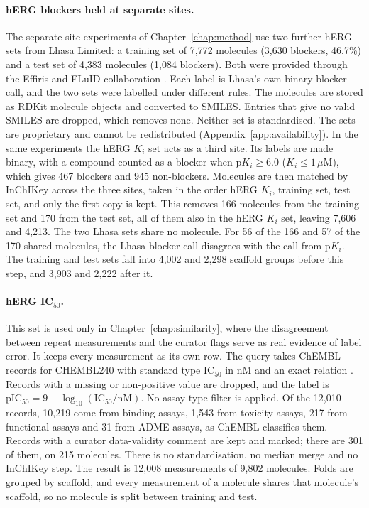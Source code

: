 \paragraph{hERG blockers held at separate sites.} The separate-site experiments of Chapter~\ref{chap:method} use two further hERG sets from Lhasa Limited: a training set of 7,772 molecules (3,630 blockers, 46.7\%) and a test set of 4,383 molecules (1,084 blockers). Both were provided through the Effiris and FLuID collaboration \citep{Bassani2023, Hanser2023}. Each label is Lhasa's own binary blocker call, and the two sets were labelled under different rules. The molecules are stored as RDKit molecule objects and converted to SMILES. Entries that give no valid SMILES are dropped, which removes none. Neither set is standardised. The sets are proprietary and cannot be redistributed (Appendix~\ref{app:availability}). In the same experiments the hERG $K_i$ set acts as a third site. Its labels are made binary, with a compound counted as a blocker when $\mathrm{p}K_i \ge 6.0$ ($K_i \le 1\,\mu$M), which gives 467 blockers and 945 non-blockers. Molecules are then matched by InChIKey across the three sites, taken in the order hERG $K_i$, training set, test set, and only the first copy is kept. This removes 166 molecules from the training set and 170 from the test set, all of them also in the hERG $K_i$ set, leaving 7,606 and 4,213. The two Lhasa sets share no molecule. For 56 of the 166 and 57 of the 170 shared molecules, the Lhasa blocker call disagrees with the call from p$K_i$. The training and test sets fall into 4,002 and 2,298 scaffold groups before this step, and 3,903 and 2,222 after it.

\paragraph{\texorpdfstring{hERG IC$_{50}$.}{hERG IC50.}} This set is used only in Chapter~\ref{chap:similarity}, where the disagreement between repeat measurements and the curator flags serve as real evidence of label error. It keeps every measurement as its own row. The query takes ChEMBL records for CHEMBL240 with standard type IC$_{50}$ in nM and an exact relation \citep{Zdrazil2023}. Records with a missing or non-positive value are dropped, and the label is $\mathrm{pIC_{50}} = 9 - \log_{10}(\mathrm{IC_{50}}/\mathrm{nM})$. No assay-type filter is applied. Of the 12,010 records, 10,219 come from binding assays, 1,543 from toxicity assays, 217 from functional assays and 31 from ADME assays, as ChEMBL classifies them. Records with a curator data-validity comment are kept and marked; there are 301 of them, on 215 molecules. There is no standardisation, no median merge and no InChIKey step. The result is 12,008 measurements of 9,802 molecules. Folds are grouped by scaffold, and every measurement of a molecule shares that molecule's scaffold, so no molecule is split between training and test.

